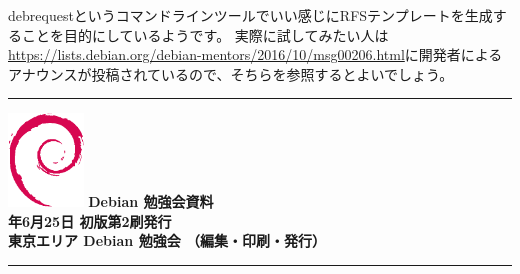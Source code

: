 \documentclass[mingoth,a4paper]{jsarticle}
\newcommand{\debmtgyear}{2016}
\newcommand{\debmtgmonth}{6}
\newcommand{\debmtgdate}{25}
\begin{document}
debrequestというコマンドラインツールでいい感じにRFSテンプレートを生成することを目的にしているようです。
実際に試してみたい人は\url{https://lists.debian.org/debian-mentors/2016/10/msg00206.html}に開発者によるアナウンスが投稿されているので、そちらを参照するとよいでしょう。


%

\cleartooddpage

\vspace*{15cm}
\hrule
\vspace{2mm}
\includegraphics[width=2cm]{image200502/openlogo-nd.eps}
\noindent \Large \bf Debian 勉強会資料\\
\noindent \normalfont \debmtgyear{}年\debmtgmonth{}月\debmtgdate{}日 \hspace{5mm}  初版第2刷発行\\
\noindent \normalfont 東京エリア Debian 勉強会 （編集・印刷・発行）\\
\hrule
\end{document}
